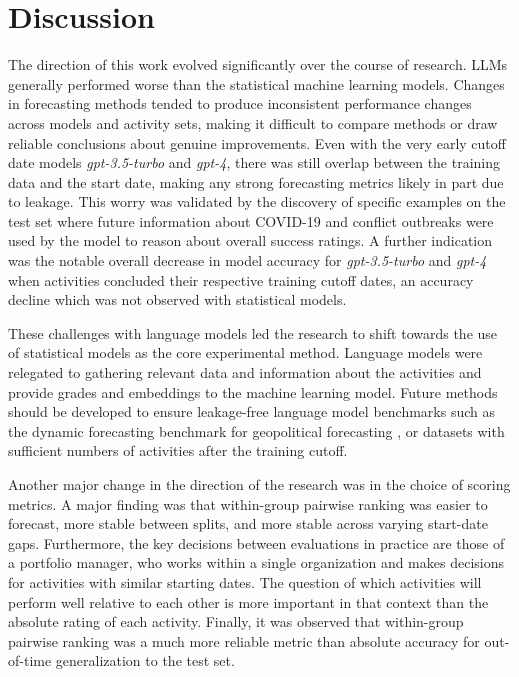 \documentclass[12pt,a4paper]{article}
\let\citep\parencite
\begin{document}
\section{Discussion}
The direction of this work evolved significantly over the course of research. LLMs generally performed worse than the statistical machine learning models. Changes in forecasting methods tended to produce inconsistent performance changes across models and activity sets, making it difficult to compare methods or draw reliable conclusions about genuine improvements. Even with the very early cutoff date models \emph{gpt-3.5-turbo} and \emph{gpt-4}, there was still overlap between the training data and the start date, making any strong forecasting metrics likely in part due to leakage. This worry was validated by the discovery of specific examples on the test set where future information about COVID-19 and conflict outbreaks were used by the model to reason about overall success ratings. A further indication was the notable overall decrease in model accuracy for \emph{gpt-3.5-turbo} and \emph{gpt-4} when activities concluded their respective training cutoff dates, an accuracy decline which was not observed with statistical models.

These challenges with language models led the research to shift towards the use of statistical models as the core experimental method. Language models were relegated to gathering relevant data and information about the activities and provide grades and embeddings to the machine learning model. Future methods should be developed to ensure leakage-free language model benchmarks such as the dynamic forecasting benchmark for geopolitical forecasting \citep{kargerForecastBenchDynamicBenchmark2024}, or datasets with sufficient numbers of activities after the training cutoff. 

Another major change in the direction of the research was in the choice of scoring metrics. A major finding was that within-group pairwise ranking was easier to forecast, more stable between splits, and more stable across varying start-date gaps. Furthermore, the key decisions between evaluations in practice are those of a portfolio manager, who works within a single organization and makes decisions for activities with similar starting dates. The question of which activities will perform well relative to each other is more important in that context than the absolute rating of each activity. Finally, it was observed that within-group pairwise ranking was a much more reliable metric than absolute accuracy for out-of-time generalization to the test set.
\end{document}
